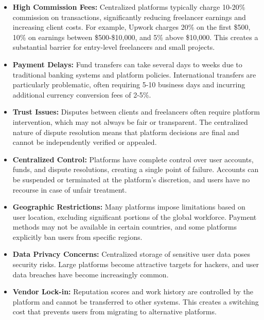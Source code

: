 \documentclass[a4paper,13pt,twoside]{report}
\theoremstyle{definition}
\begin{document}
\begin{itemize}
    \item \textbf{High Commission Fees:} Centralized platforms typically charge 10-20\% commission on transactions, significantly reducing freelancer earnings and increasing client costs. For example, Upwork charges 20\% on the first \$500, 10\% on earnings between \$500-\$10,000, and 5\% above \$10,000. This creates a substantial barrier for entry-level freelancers and small projects.

    \item \textbf{Payment Delays:} Fund transfers can take several days to weeks due to traditional banking systems and platform policies. International transfers are particularly problematic, often requiring 5-10 business days and incurring additional currency conversion fees of 2-5\%.

    \item \textbf{Trust Issues:} Disputes between clients and freelancers often require platform intervention, which may not always be fair or transparent. The centralized nature of dispute resolution means that platform decisions are final and cannot be independently verified or appealed.

    \item \textbf{Centralized Control:} Platforms have complete control over user accounts, funds, and dispute resolutions, creating a single point of failure. Accounts can be suspended or terminated at the platform's discretion, and users have no recourse in case of unfair treatment.

    \item \textbf{Geographic Restrictions:} Many platforms impose limitations based on user location, excluding significant portions of the global workforce. Payment methods may not be available in certain countries, and some platforms explicitly ban users from specific regions.

    \item \textbf{Data Privacy Concerns:} Centralized storage of sensitive user data poses security risks. Large platforms become attractive targets for hackers, and user data breaches have become increasingly common.

    \item \textbf{Vendor Lock-in:} Reputation scores and work history are controlled by the platform and cannot be transferred to other systems. This creates a switching cost that prevents users from migrating to alternative platforms.
\end{itemize}
\end{document}

